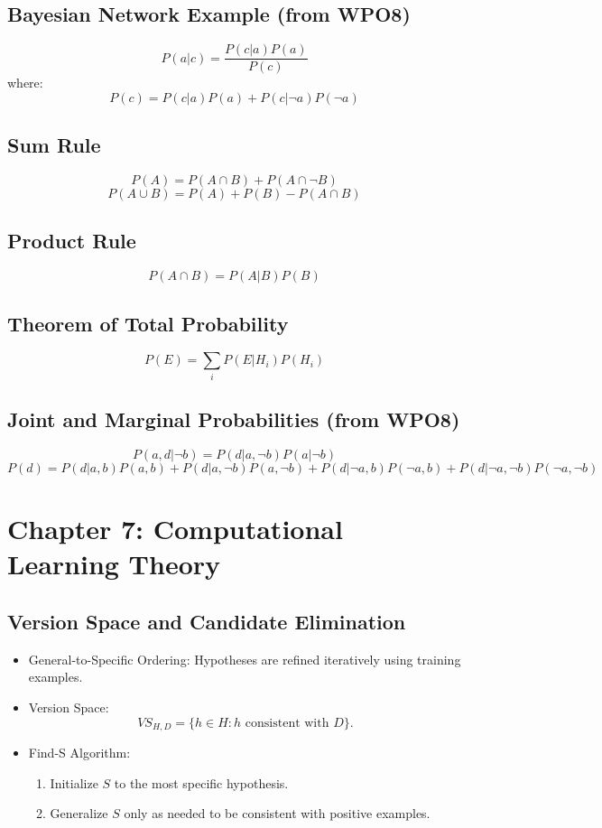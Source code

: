 \documentclass[10pt,a4paper]{article}
\begin{document}
\subsection*{Bayesian Network Example (from WPO8)}
\[
P(a|c) = \frac{P(c|a)P(a)}{P(c)}
\]
where:
\[
P(c) = P(c|a)P(a) + P(c|\neg a)P(\neg a)
\]

\subsection*{Sum Rule}
\[
P(A) = P(A \cap B) + P(A \cap \neg B)
\]
\[
P(A \cup B) = P(A) + P(B) - P(A \cap B)
\]
\subsection*{Product Rule}
\[
P(A \cap B) = P(A|B)P(B)
\]

\subsection*{Theorem of Total Probability}
\[
P(E) = \sum_{i} P(E|H_i)P(H_i)
\]


\subsection*{Joint and Marginal Probabilities (from WPO8)}
\[
P(a, d|\neg b) = P(d|a, \neg b)P(a|\neg b)
\]
\[
P(d) = P(d|a, b)P(a, b) + P(d|a, \neg b)P(a, \neg b) + P(d|\neg a, b)P(\neg a, b) + P(d|\neg a, \neg b)P(\neg a, \neg b)
\]

\section*{Chapter 7: Computational Learning Theory}
\subsection*{Version Space and Candidate Elimination}
\begin{itemize}
	\item General-to-Specific Ordering: Hypotheses are refined iteratively using training examples.
	\item Version Space:
	\[
	VS_{H,D} = \{ h \in H : h \text{ consistent with } D \}.
	\]
	\item Find-S Algorithm:
	\begin{enumerate}
		\item Initialize \( S \) to the most specific hypothesis.
		\item Generalize \( S \) only as needed to be consistent with positive examples.
	\end{enumerate}
\end{itemize}
\end{document}
